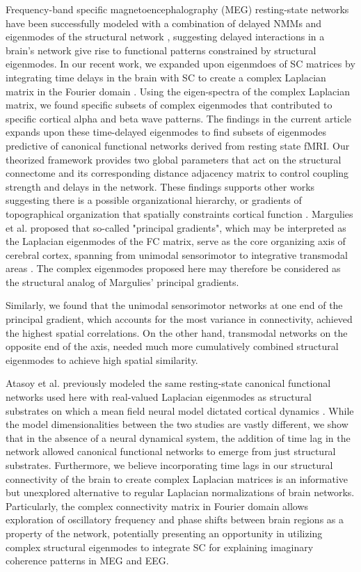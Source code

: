 Frequency-band specific magnetoencephalography (MEG) resting-state networks have been successfully modeled with a combination of delayed NMMs and eigenmodes of the structural network \cite{tewarie_how_2019}, suggesting delayed interactions in a brain's network give rise to functional patterns constrained by structural eigenmodes. In our recent work, we expanded upon eigenmdoes of SC matrices by integrating time delays in the brain with SC to create a complex Laplacian matrix in the Fourier domain \cite{Raj2020}. Using the eigen-spectra of the complex Laplacian matrix, we found specific subsets of complex eigenmodes that contributed to specific cortical alpha and beta wave patterns. The findings in the current article expands upon these time-delayed eigenmodes to find subsets of eigenmodes predictive of canonical functional networks derived from resting state fMRI. Our theorized framework provides two global parameters that act on the structural connectome and its corresponding distance adjacency matrix to control coupling strength and delays in the network. These findings supports other works suggesting there is a possible organizational hierarchy, or gradients of topographical organization that spatially constraints cortical function \cite{margulies_situating_2016, sepulcre_stepwise_2012, vazquez-rodriguez_gradients_2019, huntenburg_large-scale_2018, buckner_macroscale_2019}. Margulies et al. proposed that so-called "principal gradients", which may be interpreted as the Laplacian eigenmodes of the FC matrix, serve as the core organizing axis of cerebral cortex, spanning from unimodal sensorimotor to integrative transmodal areas \cite{margulies_situating_2016}. The complex eigenmodes proposed here may therefore be considered as the structural analog of Margulies' principal gradients.

Similarly, we found that the unimodal sensorimotor networks at one end of the principal gradient, which accounts for the most variance in connectivity, achieved the highest spatial correlations. On the other hand, transmodal networks on the opposite end of the axis, needed much more cumulatively combined structural eigenmodes to achieve high spatial similarity. 

Atasoy et al. previously modeled the same resting-state canonical functional networks used here with real-valued Laplacian eigenmodes as structural substrates on which a mean field neural model dictated cortical dynamics \cite{Atasoy2016}. While the model dimensionalities between the two studies are vastly different, we show that in the absence of a neural dynamical system, the addition of time lag in the network allowed canonical functional networks to emerge from just structural substrates. Furthermore, we believe incorporating time lags in our structural connectivity of the brain to create complex Laplacian matrices is an informative but unexplored alternative to regular Laplacian normalizations of brain networks. Particularly, the complex connectivity matrix in Fourier domain allows exploration of oscillatory frequency and phase shifts between brain regions as a property of the network, potentially presenting an opportunity in utilizing complex structural eigenmodes to integrate SC for explaining imaginary coherence patterns in MEG and EEG. 

